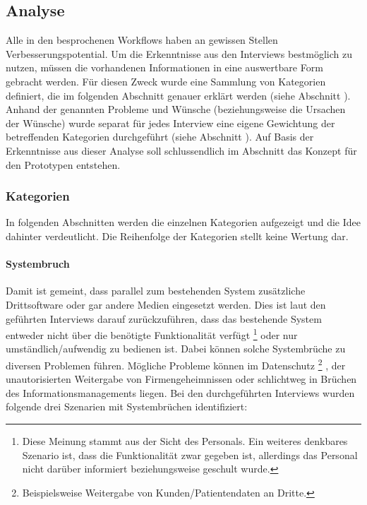 \documentclass[Bachelorarbeit.tex]{subfiles}
\begin{document}
\subsection{Analyse}
\label{AnalyseInterviews}
Alle in den  besprochenen Workflows haben an gewissen Stellen Verbesserungspotential. 
Um die Erkenntnisse aus den Interviews bestmöglich zu nutzen, müssen die vorhandenen Informationen in eine auswertbare Form gebracht werden.
Für diesen Zweck wurde eine Sammlung von Kategorien definiert, die im folgenden Abschnitt genauer erklärt werden (siehe Abschnitt ).
Anhand der genannten Probleme und Wünsche (beziehungsweise die Ursachen der Wünsche) wurde separat für jedes Interview eine eigene Gewichtung der betreffenden Kategorien durchgeführt (siehe Abschnitt ). 
Auf Basis der Erkenntnisse aus dieser Analyse soll schlussendlich im Abschnitt  das Konzept für den Prototypen entstehen.


\subsubsection{Kategorien}
\label{analyse:kategorien}
In folgenden Abschnitten werden die einzelnen Kategorien aufgezeigt und die Idee dahinter verdeutlicht.
Die Reihenfolge der Kategorien stellt keine Wertung dar.

\paragraph{Systembruch}
\label{interviewsAnalyseSystembruch}
Damit ist gemeint, dass parallel zum bestehenden System zusätzliche Drittsoftware oder gar andere Medien eingesetzt werden.
Dies ist laut den geführten Interviews darauf zurückzuführen, dass das bestehende System entweder nicht über die benötigte Funktionalität verfügt
\footnote{
	Diese Meinung stammt aus der Sicht des Personals. 
	Ein weiteres denkbares Szenario ist, dass die Funktionalität zwar gegeben ist, allerdings das Personal nicht darüber informiert beziehungsweise geschult wurde.
	} 
oder nur umständlich/aufwendig zu bedienen ist.
Dabei können solche Systembrüche zu diversen Problemen führen. 
Mögliche Probleme können im Datenschutz
\footnote{
	Beispielsweise Weitergabe von Kunden/Patientendaten an Dritte.
	}
	, der unautorisierten Weitergabe von Firmengeheimnissen oder schlichtweg in Brüchen des Informationsmanagements liegen.  
Bei den durchgeführten Interviews wurden folgende drei Szenarien mit Systembrüchen identifiziert:
\end{document}
